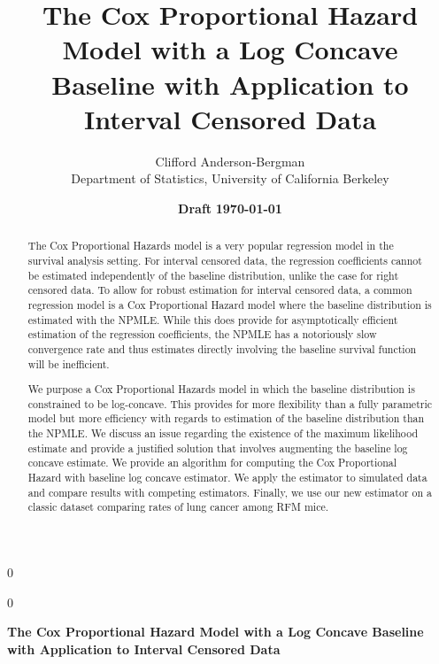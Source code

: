 \documentclass[11pt]{article}
\date{\textbf{Draft} \textbf{\today}}
\newcommand{\blind}{0}
\numberwithin{equation}{section}
\begin{document}
%


\def\spacingset#1{\renewcommand{\baselinestretch}%
{#1}\small\normalsize} \spacingset{1}



\blind
{
  \title{The Cox Proportional Hazard Model with a Log Concave Baseline with Application to Interval Censored Data}
  \author{Clifford Anderson-Bergman\\
    Department of Statistics, University of California Berkeley\\
    }
  \maketitle
} \fi

\blind
{
  \bigskip
  \bigskip
  \bigskip
  \begin{center}
    {\large\bf The Cox Proportional Hazard Model with a Log Concave Baseline with Application to Interval Censored Data}
\end{center}
  \medskip
} \fi


\spacingset{1.4}


\begin{abstract}

	The Cox Proportional Hazards model is a very popular regression model in the survival analysis setting. For interval censored data, the regression coefficients cannot be estimated independently of the baseline distribution, unlike the case for right censored data. To allow for robust estimation for interval censored data, a common regression model is a Cox Proportional Hazard model where the baseline distribution is estimated with the NPMLE. While this does provide for asymptotically efficient estimation of the regression coefficients, 
the NPMLE has a notoriously slow convergence rate and thus estimates directly involving the baseline survival function will be inefficient. 

	We purpose a Cox Proportional Hazards model in which the baseline distribution is constrained to be log-concave. This provides for more flexibility than a fully parametric model but more efficiency with regards to estimation of the baseline distribution than the NPMLE. We discuss an issue regarding the existence of the maximum likelihood estimate and provide a justified solution that involves augmenting the baseline log concave estimate. We provide an algorithm for computing the Cox Proportional Hazard with baseline log concave estimator. We apply the estimator to simulated data and compare results with competing estimators. Finally, we use our new estimator on a classic dataset comparing rates of lung cancer among RFM mice. 

\end{abstract}
\end{document}
